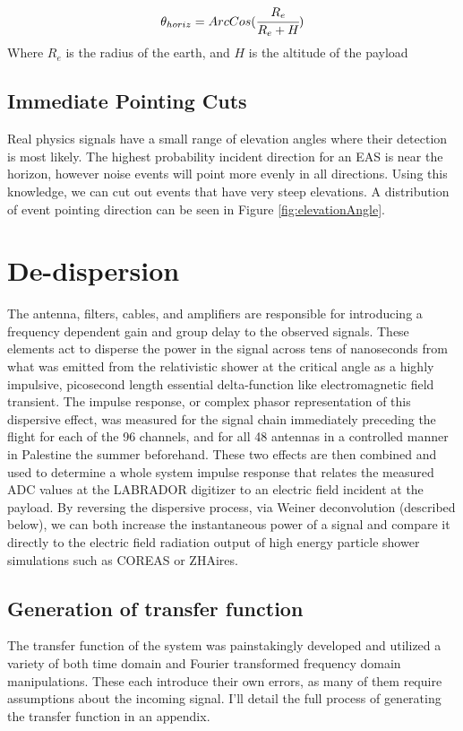 	\begin{equation}
		\theta_{horiz} = ArcCos(\cfrac{R_{e}}{R_{e}+H})
		\label{eqn:thetaHoriz}
	\end{equation}
	Where $R_{e}$ is the radius of the earth, and $H$ is the altitude of the payload
	
	\subsection{Immediate Pointing Cuts}
		Real physics signals have a small range of elevation angles where their detection is most likely.  The highest probability incident direction for an EAS is near the horizon, however noise events will point more evenly in all directions.  Using this knowledge, we can cut out events that have very steep elevations.  A distribution of event pointing direction can be seen in Figure \ref{fig:elevationAngle}.


\section{De-dispersion}
	The antenna, filters, cables, and amplifiers are responsible for introducing a frequency dependent gain and group delay to the observed signals.  These elements act to disperse the power in the signal across tens of nanoseconds from what was emitted from the relativistic shower at the critical angle as a highly impulsive, picosecond length essential delta-function like electromagnetic field transient.  The impulse response, or complex phasor representation of this dispersive effect, was measured for the signal chain immediately preceding the flight for each of the 96 channels, and for all 48 antennas in a controlled manner in Palestine the summer beforehand.  These two effects are then combined and used to determine a whole system impulse response that relates the measured ADC values at the LABRADOR digitizer to an electric field incident at the payload.  By reversing the dispersive process, via Weiner deconvolution (described below), we can both increase the instantaneous power of a signal and compare it directly to the electric field radiation output of high energy particle shower simulations such as COREAS or ZHAires.
	\subsection{Generation of transfer function}
		The transfer function of the system was painstakingly developed and utilized a variety of both time domain and Fourier transformed frequency domain manipulations.  These each introduce their own errors, as many of them require assumptions about the incoming signal.  I'll detail the full process of generating the transfer function in an appendix.
